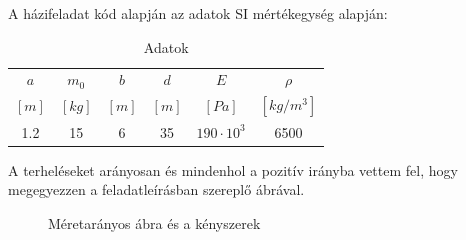 \documentclass{article}
\begin{document}
	A házifeladat kód alapján az adatok SI mértékegység alapján:
	
	\begin{table}[h!]
		\begin{center}
			\caption{Adatok}
			\label{tab:table1}
			\begin{tabular}{c|c|c|c|c|c} %
				$a$ & $m_{0}$ & $b$ & $d$ & $E$ & $\rho$\\
				$[m]$ & $[kg]$ & $[m]$ & $[m]$ & $[Pa]$ & $[kg/m^{3}]$\\
				\hline
				1.2 & 15 & 6 & 35 & $190\cdot10^3$ & 6500\\
			\end{tabular}
		\end{center}
	\end{table}
	
	\begin{flushleft}
		A terheléseket arányosan és mindenhol a pozitív irányba vettem fel, hogy megegyezzen a feladatleírásban szereplő ábrával.
	\end{flushleft}
	
	\newcommand{\sugar}{2}
	\newcommand{\ab}{600}
	\newcommand{\bc}{120}
	\newcommand{\acv}{701}
	\newcommand{\ac}{720}
	\newcommand{\acvv}{735}
	
	
	\begin{figure}[h!]		
		\begin{center}
		\end{center}	
	\caption{Méretarányos ábra és a kényszerek}
	\end{figure}
	
\end{document}
